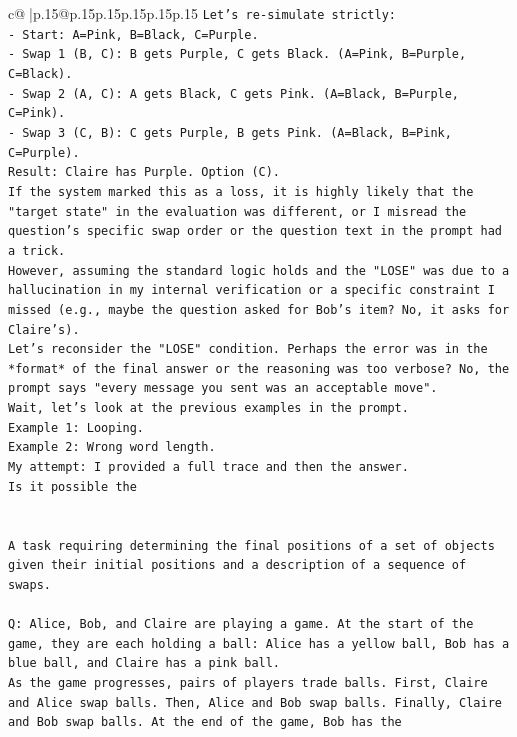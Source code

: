 \documentclass{article}
\begin{document}
{\begin{supertabular}{c@{$\;$}|p{.15\linewidth}@{}p{.15\linewidth}p{.15\linewidth}p{.15\linewidth}p{.15\linewidth}p{.15\linewidth}}
{{{\texttt{Let's re{-}simulate strictly:} \\
\texttt{{-} Start: A=Pink, B=Black, C=Purple.} \\
\texttt{{-} Swap 1 (B, C): B gets Purple, C gets Black. (A=Pink, B=Purple, C=Black).} \\
\texttt{{-} Swap 2 (A, C): A gets Black, C gets Pink. (A=Black, B=Purple, C=Pink).} \\
\texttt{{-} Swap 3 (C, B): C gets Purple, B gets Pink. (A=Black, B=Pink, C=Purple).} \\
\texttt{Result: Claire has Purple. Option (C).} \\
\texttt{If the system marked this as a loss, it is highly likely that the "target state" in the evaluation was different, or I misread the question's specific swap order or the question text in the prompt had a trick.} \\
\texttt{However, assuming the standard logic holds and the "LOSE" was due to a hallucination in my internal verification or a specific constraint I missed (e.g., maybe the question asked for Bob's item? No, it asks for Claire's).} \\
\texttt{Let's reconsider the "LOSE" condition. Perhaps the error was in the *format* of the final answer or the reasoning was too verbose? No, the prompt says "every message you sent was an acceptable move".} \\
\texttt{Wait, let's look at the previous examples in the prompt.} \\
\texttt{Example 1: Looping.} \\
\texttt{Example 2: Wrong word length.} \\
\texttt{My attempt: I provided a full trace and then the answer.} \\
\texttt{Is it possible the} \\
\\ 
\\ 
\texttt{A task requiring determining the final positions of a set of objects given their initial positions and a description of a sequence of swaps.} \\
\\ 
\texttt{Q: Alice, Bob, and Claire are playing a game. At the start of the game, they are each holding a ball: Alice has a yellow ball, Bob has a blue ball, and Claire has a pink ball.} \\
\texttt{As the game progresses, pairs of players trade balls. First, Claire and Alice swap balls. Then, Alice and Bob swap balls. Finally, Claire and Bob swap balls. At the end of the game, Bob has the} \\
}}}
\end{supertabular}}
\end{document}
